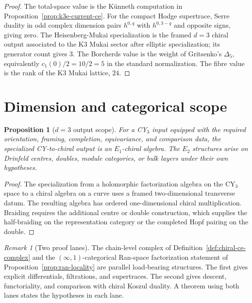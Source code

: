 \documentclass[11pt]{amsart}
\theoremstyle{plain}
\newtheorem{proposition}[theorem]{Proposition}
\theoremstyle{definition}
\theoremstyle{remark}
\newtheorem{remark}[theorem]{Remark}
\begin{document}
\begin{proof}
The total-space value is the K\"unneth computation in
Proposition~\ref{prop:k3e-current-ce}. For the compact Hodge supertrace,
Serre duality in odd complex dimension pairs $h^{0,q}$ with
$h^{0,3-q}$ and opposite signs, giving zero. The Heisenberg-Mukai
specialization is the framed $d=3$ chiral output associated to the K3
Mukai sector after elliptic specialization; its generator count gives
$3$. The Borcherds value is the weight of Gritsenko's
$\Delta_5$, equivalently $c_1(0)/2=10/2=5$ in the standard
normalization. The fibre value is the rank of the K3 Mukai lattice,
$24$.
\end{proof}

\section{Dimension and categorical scope}

\begin{proposition}[$d=3$ output scope]\label{prop:d3-output-scope}
For a CY$_3$ input equipped with the required orientation, framing,
completion, equivariance, and comparison data, the specialized
CY-to-chiral output is an $E_1$-chiral algebra. The $E_2$ structures
arise on Drinfeld centres, doubles, module categories, or bulk layers
under their own hypotheses.
\end{proposition}

\begin{proof}
The specialization from a holomorphic factorization algebra on the
CY$_3$ space to a chiral algebra on a curve uses a framed
two-dimensional transverse datum. The resulting algebra has ordered
one-dimensional chiral multiplication. Braiding requires the additional
centre or double construction, which supplies the half-braiding on the
representation category or the completed Hopf pairing on the double.
\end{proof}

\begin{remark}[Two proof lanes]\label{rem:two-proof-lanes}
The chain-level complex of Definition~\ref{def:chiral-ce-complex} and
the $(\infty,1)$-categorical Ran-space factorization statement of
Proposition~\ref{prop:ran-locality} are parallel load-bearing structures.
The first gives explicit differentials, filtrations, and supertraces.
The second gives descent, functoriality, and comparison with chiral
Koszul duality. A theorem using both lanes states the hypotheses in
each lane.
\end{remark}
\end{document}
